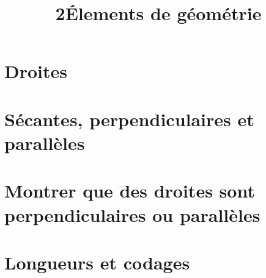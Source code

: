 \documentclass[12pt,a4paper]{article}
\date{}
\title{\textcircled{{\normalsize{2}}}\'Elements de géométrie}
\begin{document}
%
%


\maketitle



\section{Droites}



\newpage


\section{Sécantes, perpendiculaires et parallèles}



\section{Montrer que des droites sont perpendiculaires ou parallèles}


\section{Longueurs et codages}


\end{document}
